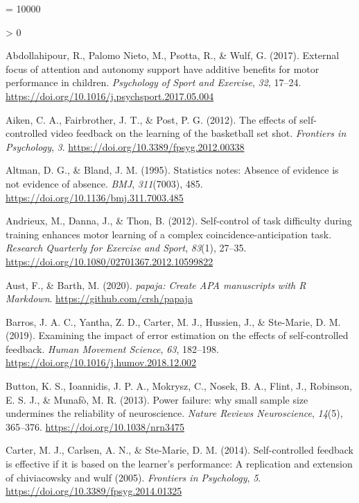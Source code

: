 \documentclass[
  english,
  man,floatsintext]{apa7}
\newlength{\cslhangindent}
\newenvironment{CSLReferences}[2] %
 {%
  \setlength{\parindent}{0pt}
  \ifodd #1 \everypar{\setlength{\hangindent}{\cslhangindent}}\ignorespaces\fi
  \ifnum #2 > 0
  \setlength{\parskip}{#2\baselineskip}
  \fi
 }%
 {}
\begin{document}
\begingroup
\interlinepenalty = 10000
\setlength{\parindent}{-0.5in}
\setlength{\leftskip}{0.5in}

\endgroup

\hypertarget{refs}{}
\begin{CSLReferences}{1}{0}
\leavevmode\hypertarget{ref-abdollahipour2017}{}%
Abdollahipour, R., Palomo Nieto, M., Psotta, R., \& Wulf, G. (2017). External focus of attention and autonomy support have additive benefits for motor performance in children. \emph{Psychology of Sport and Exercise}, \emph{32}, 17--24. \url{https://doi.org/10.1016/j.psychsport.2017.05.004}

\leavevmode\hypertarget{ref-aiken2012}{}%
Aiken, C. A., Fairbrother, J. T., \& Post, P. G. (2012). The effects of self-controlled video feedback on the learning of the basketball set shot. \emph{Frontiers in Psychology}, \emph{3}. \url{https://doi.org/10.3389/fpsyg.2012.00338}

\leavevmode\hypertarget{ref-altman1995}{}%
Altman, D. G., \& Bland, J. M. (1995). Statistics notes: Absence of evidence is not evidence of absence. \emph{BMJ}, \emph{311}(7003), 485. \url{https://doi.org/10.1136/bmj.311.7003.485}

\leavevmode\hypertarget{ref-andrieux2012}{}%
Andrieux, M., Danna, J., \& Thon, B. (2012). Self-control of task difficulty during training enhances motor learning of a complex coincidence-anticipation task. \emph{Research Quarterly for Exercise and Sport}, \emph{83}(1), 27--35. \url{https://doi.org/10.1080/02701367.2012.10599822}

\leavevmode\hypertarget{ref-R-papaja}{}%
Aust, F., \& Barth, M. (2020). \emph{{papaja}: {Create} {APA} manuscripts with {R Markdown}}. \url{https://github.com/crsh/papaja}

\leavevmode\hypertarget{ref-barros2019}{}%
Barros, J. A. C., Yantha, Z. D., Carter, M. J., Hussien, J., \& Ste-Marie, D. M. (2019). Examining the impact of error estimation on the effects of self-controlled feedback. \emph{Human Movement Science}, \emph{63}, 182--198. \url{https://doi.org/10.1016/j.humov.2018.12.002}

\leavevmode\hypertarget{ref-button2013}{}%
Button, K. S., Ioannidis, J. P. A., Mokrysz, C., Nosek, B. A., Flint, J., Robinson, E. S. J., \& Munafò, M. R. (2013). Power failure: why small sample size undermines the reliability of neuroscience. \emph{Nature Reviews Neuroscience}, \emph{14}(5), 365--376. \url{https://doi.org/10.1038/nrn3475}

\leavevmode\hypertarget{ref-carter2014}{}%
Carter, M. J., Carlsen, A. N., \& Ste-Marie, D. M. (2014). Self-controlled feedback is effective if it is based on the learner{'}s performance: A replication and extension of chiviacowsky and wulf (2005). \emph{Frontiers in Psychology}, \emph{5}. \url{https://doi.org/10.3389/fpsyg.2014.01325}


\end{CSLReferences}
\end{document}
